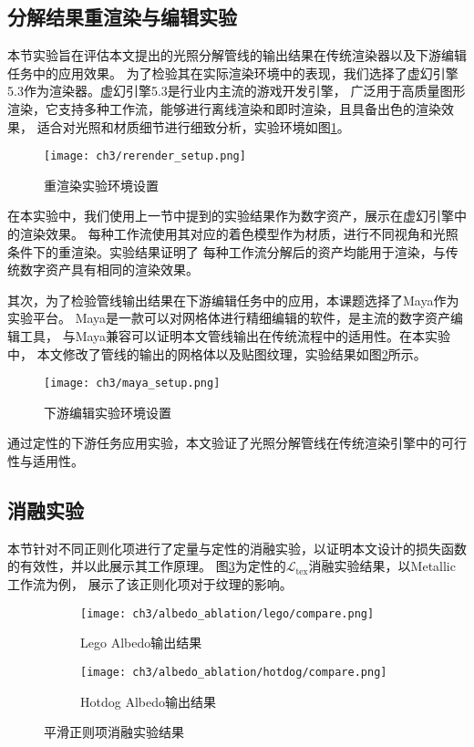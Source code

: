\subsection{分解结果重渲染与编辑实验}

本节实验旨在评估本文提出的光照分解管线的输出结果在传统渲染器以及下游编辑任务中的应用效果。
为了检验其在实际渲染环境中的表现，我们选择了虚幻引擎5.3作为渲染器。虚幻引擎5.3是行业内主流的游戏开发引擎，
广泛用于高质量图形渲染，它支持多种工作流，能够进行离线渲染和即时渲染，且具备出色的渲染效果，
适合对光照和材质细节进行细致分析，实验环境如图\ref{fig:rerender_setup}。

\begin{figure}[htb]
  \centering
  \texttt{[image: ch3/rerender\_setup.png]}
  \caption{重渲染实验环境设置}
  \label{fig:rerender_setup}
\end{figure}

在本实验中，我们使用上一节中提到的实验结果作为数字资产，展示在虚幻引擎中的渲染效果。
每种工作流使用其对应的着色模型作为材质，进行不同视角和光照条件下的重渲染。实验结果证明了
每种工作流分解后的资产均能用于渲染，与传统数字资产具有相同的渲染效果。

其次，为了检验管线输出结果在下游编辑任务中的应用，本课题选择了Maya作为实验平台。
Maya是一款可以对网格体进行精细编辑的软件，是主流的数字资产编辑工具，
与Maya兼容可以证明本文管线输出在传统流程中的适用性。在本实验中，
本文修改了管线的输出的网格体以及贴图纹理，实验结果如图\ref{fig:edit_setup}所示。

\begin{figure}[htb]
  \centering
  \texttt{[image: ch3/maya\_setup.png]}
  \caption{下游编辑实验环境设置}
  \label{fig:edit_setup}
\end{figure}

\newpage

通过定性的下游任务应用实验，本文验证了光照分解管线在传统渲染引擎中的可行性与适用性。

\subsection{消融实验}

本节针对不同正则化项进行了定量与定性的消融实验，以证明本文设计的损失函数的有效性，并以此展示其工作原理。
图\ref{fig:l_tex_ablation}为定性的$\mathcal{L}_\text{tex}$消融实验结果，以Metallic工作流为例，
展示了该正则化项对于纹理的影响。
\begin{figure}[H]
  \centering
  \begin{subfigure}[c]{0.45\textwidth}
    \centering
    \texttt{[image: ch3/albedo\_ablation/lego/compare.png]}
    \caption{Lego Albedo输出结果}
  \end{subfigure}
  \hspace{2mm}
  \begin{subfigure}[c]{0.45\textwidth}
    \centering
    \texttt{[image: ch3/albedo\_ablation/hotdog/compare.png]}
    \caption{Hotdog Albedo输出结果}
  \end{subfigure}
  \caption{平滑正则项消融实验结果}
  \label{fig:l_tex_ablation}
\end{figure}

